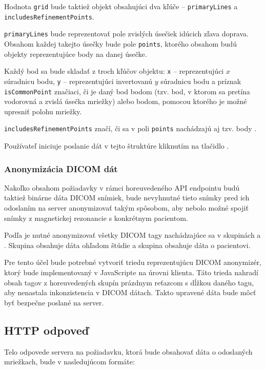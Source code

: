 Hodnota \texttt{grid} bude taktiež objekt obsahujúci dva kľúče -- \texttt{primaryLines} a \newline \texttt{includesRefinementPoints}.

\texttt{primaryLines} bude reprezentovať pole zvislých úsečiek idúcich zľava doprava.
Obsahom každej takejto úsečky bude pole \texttt{points}, ktorého obsahom budú objekty reprezentujúce body na danej úsečke.

Každý bod sa bude skladať z troch kľúčov objektu: \texttt{x} -- reprezentujúci $x$ súradnicu bodu, \texttt{y} -- reprezentujúci invertovanú $y$ súradnicu bodu a príznak \texttt{isCommonPoint} značiaci, či je daný bod  bodom (tzv. bod, v ktorom sa pretína vodorovná a zvislá úsečka mriežky) alebo  bodom, pomocou ktorého je možné upresniť polohu mriežky. 

\texttt{includesRefinementPoints} značí, či sa v poli \texttt{points} nachádzajú aj tzv.  body .

Používateľ iniciuje poslanie dát v tejto štruktúre kliknutím na tlačidlo .

\subsubsection {Anonymizácia DICOM dát}
Nakoľko obsahom požiadavky v rámci horeuvedeného API endpointu budú taktiež binárne dáta DICOM snímiek, bude nevyhnutné tieto snímky pred ich odoslaním na server anonymizovať takým spôsobom, aby nebolo možné spojiť snímky z magnetickej rezonancie s konkrétnym pacientom.

Podľa \cite{Varma_2012} je nutné anonymizovať všetky DICOM tagy nachádzajúce sa v skupinách  a . Skupina  obsahuje dáta ohľadom štúdie a skupina  obsahuje dáta o pacientovi.

\clearpage

Pre tento účel bude potrebné vytvoriť triedu reprezentujúcu DICOM anonymizér, ktorý bude implementovaný v JavaScripte na úrovni klienta. Táto trieda nahradí obsah tagov z horeuvedených skupín prázdnym reťazcom s dĺžkou daného tagu, aby nenastala inkonzistencia v DICOM dátach. Takto upravené dáta bude môcť byť bezpečne poslané na server.

\subsection{HTTP odpoveď}
Telo odpovede servera na požiadavku, ktorá bude obsahovať dáta o odoslaných mriežkach, bude v nasledujúcom formáte:

